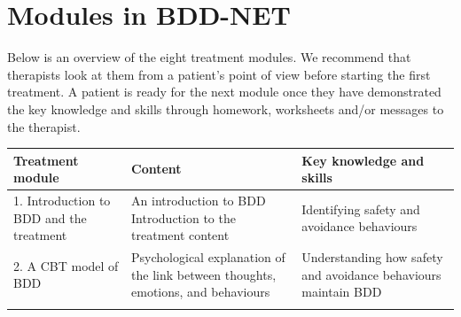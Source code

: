 \documentclass[]{book}
\theoremstyle{definition}
\theoremstyle{definition}
\theoremstyle{definition}
\theoremstyle{remark}
\begin{document}
\hypertarget{modules-in-bdd-net}{%
\section{Modules in BDD-NET}\label{modules-in-bdd-net}}

Below is an overview of the eight treatment modules. We recommend that
therapists look at them from a patient's point of view before starting
the first treatment. A patient is ready for the next module once they
have demonstrated the key knowledge and skills through homework,
worksheets and/or messages to the therapist.

\begin{longtable}[]{@{}lll@{}}
\toprule
\begin{minipage}[b]{0.33\columnwidth}\raggedright
\textbf{Treatment module}\strut
\end{minipage} & \begin{minipage}[b]{0.33\columnwidth}\raggedright
\textbf{Content}\strut
\end{minipage} & \begin{minipage}[b]{0.25\columnwidth}\raggedright
\textbf{Key knowledge and skills}\strut
\end{minipage}\tabularnewline
\midrule
\endhead
\begin{minipage}[t]{0.33\columnwidth}\raggedright
1. Introduction to BDD and the treatment\strut
\end{minipage} & \begin{minipage}[t]{0.33\columnwidth}\raggedright
An introduction to BDD Introduction to the treatment content\strut
\end{minipage} & \begin{minipage}[t]{0.25\columnwidth}\raggedright
Identifying safety and avoidance behaviours\strut
\end{minipage}\tabularnewline
\begin{minipage}[t]{0.33\columnwidth}\raggedright
2. A CBT model of BDD\strut
\end{minipage} & \begin{minipage}[t]{0.33\columnwidth}\raggedright
Psychological explanation of the link between thoughts, emotions, and
behaviours\strut
\end{minipage} & \begin{minipage}[t]{0.25\columnwidth}\raggedright
Understanding how safety and avoidance behaviours maintain BDD\strut
\end{minipage}\tabularnewline
\begin{minipage}[t]{0.33\columnwidth}\raggedright

\end{minipage}
\end{longtable}
\end{document}
